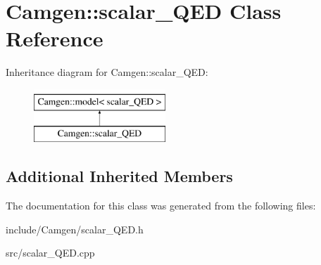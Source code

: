 \hypertarget{a00500}{}\section{Camgen\+:\+:scalar\+\_\+\+Q\+E\+D Class Reference}
\label{a00500}
Inheritance diagram for Camgen\+:\+:scalar\+\_\+\+Q\+E\+D\+:\begin{figure}[H]
\begin{center}
\leavevmode
\includegraphics[height=2.000000cm]{a00500}
\end{center}
\end{figure}
\subsection*{Additional Inherited Members}


The documentation for this class was generated from the following files\+:\begin{DoxyCompactItemize}
\item 
include/\+Camgen/scalar\+\_\+\+Q\+E\+D.\+h\item 
src/scalar\+\_\+\+Q\+E\+D.\+cpp\end{DoxyCompactItemize}
